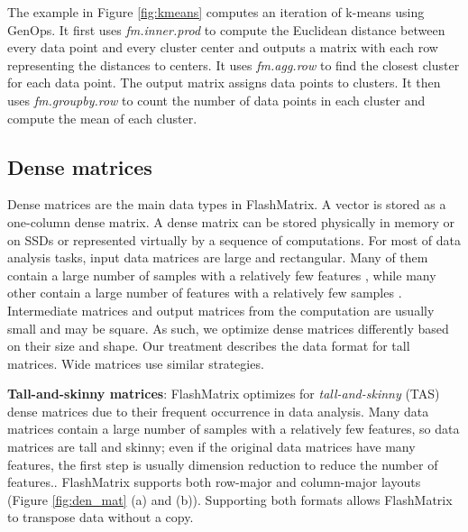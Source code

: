 The example in Figure \ref{fig:kmeans} computes an iteration of k-means
\cite{kmeans} using GenOps. It first uses \textit{fm.inner.prod} to
compute the Euclidean distance between every data point and every cluster center
and outputs a matrix with each row representing the distances to centers.  
It uses \textit{fm.agg.row} to find the closest
cluster for each data point.  The output matrix 
assigns data points to clusters. It then uses \textit{fm.groupby.row} to count
the number of data points in each cluster and compute the mean of each cluster.

\subsection{Dense matrices}
Dense matrices are the main data types in FlashMatrix. A vector is stored
as a one-column dense matrix. A dense matrix can be stored
physically in memory or on SSDs or represented virtually by a sequence of
computations.
For most of data analysis tasks, input data matrices are large and rectangular.
Many of them contain a large number of samples with a relatively
few features \cite{}, while many other contain a large number of features with
a relatively few samples \cite{}. Intermediate matrices and output matrices
from the computation are usually small and may be square. As such, we optimize
dense matrices differently based on their size and shape.
Our treatment describes the data format for tall matrices. 
Wide matrices use similar strategies.

\noindent \textbf{Tall-and-skinny matrices}:
FlashMatrix optimizes for \textit{tall-and-skinny} (TAS) dense matrices due to their
frequent occurrence in data analysis. Many data matrices contain
a large number of samples with a relatively few features, so data matrices
are tall and skinny; even if the original data matrices have many features,
the first step is usually dimension reduction \cite{} to reduce the number
of features.. FlashMatrix supports both row-major and column-major
layouts (Figure \ref{fig:den_mat} (a) and (b)).  Supporting both formats
allows FlashMatrix to transpose data without a copy.

